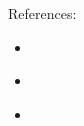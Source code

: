 
References:
\begin{itemize}
\item \cite{EFF_DES_cracker}
\item \cite{Advanced_Encryption_Standard}
\item \cite{Shor}
\end{itemize}
